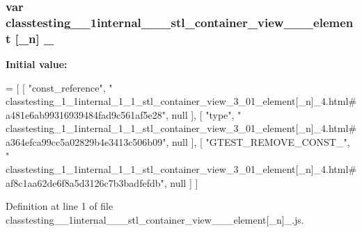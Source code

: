 \subsubsection[{\texorpdfstring{\+\_\+4}{_4}}]{\setlength{\rightskip}{0pt plus 5cm}var classtesting\+\_\+\_\+1internal\+\_\+\_\+\_\+stl\+\_\+container\+\_\+view\+\_\+\_\+\_\+element \mbox{[}\+\_\+n\mbox{]} \+\_}\hypertarget{classtesting__1__1internal__1__1__stl__container__view__3__01__element[__n]__4_8js_a301ca9742b4084df35d4a9904423c08a}{}\label{classtesting__1__1internal__1__1__stl__container__view__3__01__element[__n]__4_8js_a301ca9742b4084df35d4a9904423c08a}
{\bfseries Initial value\+:}
\begin{DoxyCode}
=
[
    [ \textcolor{stringliteral}{"const\_reference"}, \textcolor{stringliteral}{"
      classtesting\_1\_1internal\_1\_1\_stl\_container\_view\_3\_01\_element[\_n]\_4.html#a481e6ab99316939484fad9c561af5e28"}, null ],
    [ \textcolor{stringliteral}{"type"}, \textcolor{stringliteral}{"
      classtesting\_1\_1internal\_1\_1\_stl\_container\_view\_3\_01\_element[\_n]\_4.html#a364efca99cc5a02829b4e3413c506b09"}, null ],
    [ \textcolor{stringliteral}{"GTEST\_REMOVE\_CONST\_"}, \textcolor{stringliteral}{"
      classtesting\_1\_1internal\_1\_1\_stl\_container\_view\_3\_01\_element[\_n]\_4.html#af8c1aa62de6f8a5d3126c7b3badfefdb"}, null ]
]
\end{DoxyCode}


Definition at line 1 of file classtesting\+\_\+\_\+1internal\+\_\+\_\+\_\+stl\+\_\+container\+\_\+view\+\_\+\_\+\_\+element\mbox{[}\+\_\+n\mbox{]}\+\_.\+js.

